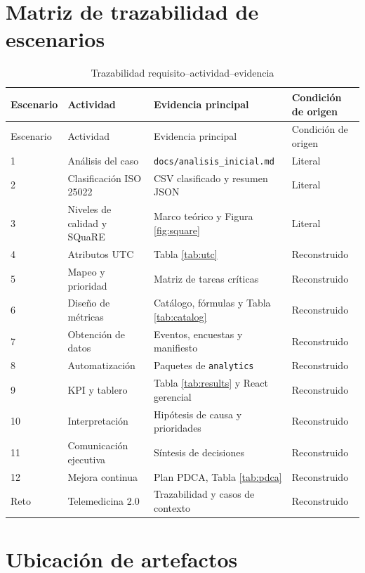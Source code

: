 \section{Matriz de trazabilidad de escenarios}

\begin{longtable}{p{1.8cm}p{3.2cm}p{4.4cm}p{2.7cm}}
\caption{Trazabilidad requisito--actividad--evidencia}\label{tab:trace}\\
\toprule
Escenario & Actividad & Evidencia principal & Condición de origen \\
\midrule
\endfirsthead
\toprule
Escenario & Actividad & Evidencia principal & Condición de origen \\
\midrule
\endhead
1 & Análisis del caso & \texttt{docs/}\allowbreak\texttt{analisis\_inicial.md} & Literal \\
2 & Clasificación ISO 25022 & CSV clasificado y resumen JSON & Literal \\
3 & Niveles de calidad y SQuaRE & Marco teórico y Figura \ref{fig:square} & Literal \\
4 & Atributos UTC & Tabla \ref{tab:utc} & Reconstruido \\
5 & Mapeo y prioridad & Matriz de tareas críticas & Reconstruido \\
6 & Diseño de métricas & Catálogo, fórmulas y Tabla \ref{tab:catalog} & Reconstruido \\
7 & Obtención de datos & Eventos, encuestas y manifiesto & Reconstruido \\
8 & Automatización & Paquetes de \texttt{analytics} & Reconstruido \\
9 & KPI y tablero & Tabla \ref{tab:results} y React gerencial & Reconstruido \\
10 & Interpretación & Hipótesis de causa y prioridades & Reconstruido \\
11 & Comunicación ejecutiva & Síntesis de decisiones & Reconstruido \\
12 & Mejora continua & Plan PDCA, Tabla \ref{tab:pdca} & Reconstruido \\
Reto & Telemedicina 2.0 & Trazabilidad y casos de contexto & Reconstruido \\
\bottomrule
\end{longtable}

\section{Ubicación de artefactos}

